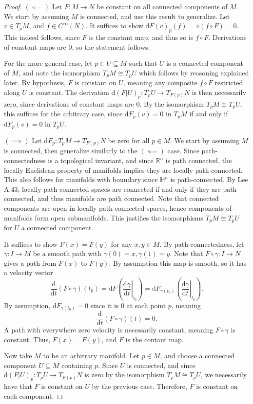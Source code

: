 \documentclass[11pt, letterpaper]{article}
\theoremstyle{plain}
\begin{document}
\begin{proof}
	$(\impliedby )$ Let $F : M \to N$ be constant on all connected components of $M$. We start by assuming $M$ is connected, and use this result to generalize. Let $v\in T_pM$, and $f\in C^\infty (N)$. It suffices to show $\mathrm{d} F(v)_p(f)=v(f\circ F)=0$. This indeed follows, since $F$ is the constant map, and thus so is $f\circ F$. Derivations of constant maps are 0, so the statement follows.

	For the more general case, let $p\in U\subseteq M$ such that $U$ is a connected component of $M$, and note the isomorphism $T_pM \cong T_pU$ which follows by reasoning explained later. By hypothesis, $F$ is constant on $U$, meaning any composite $f\circ F$ restricted along $U$ is constant. The derivation $\mathrm{d} (F|U)_p : T_pU \to T_{F(p)} N$ is then necessarily zero, since derivations of constant maps are 0. By the isomorphism $T_pM\cong T_pU$, this suffices for the arbitrary case, since $\mathrm{d} F_p(v)=0$ in $T_pM$ if and only if $\mathrm{d} F_p(v)=0$ in $T_pU$.

	$(\implies )$ Let $\mathrm{d} F_p : T_pM \to T_{F(p)} N$ be zero for all $p\in M$. We start by assuming $M$ is connected, then generalize similarly to the $(\impliedby )$ case. Since path-connectedness is a topological invariant, and since $\mathbb{R} ^n$ is path connected, the locally Euclidean property of manifolds implies they are locally path-connected. This also follows for manifolds with boundary since $\mathbb{H} ^n$ is path-connected. By Lee A.43, locally path connected spaces are connected if and only if they are path connected, and thus manifolds are path connected. Note that connected components are open in locally path-connected spaces, hence components of manifolds form open submanifolds. This justifies the isomorphisms $T_pM \cong T_pU$ for $U$ a connected component.

	It suffices to show $F(x)=F(y)$ for any $x,y\in M$. By path-connectedness, let $\gamma : I \to M$ be a smooth path with $\gamma (0)=x,\gamma (1)=y$. Note that $F\circ \gamma : I \to N$ gives a path from $F(x)$ to $F(y)$. By assumption this map is smooth, so it has a velocity vector
	\[
		\frac{\mathrm{d}}{\mathrm{d}t} (F\circ \gamma )(t_0)=\mathrm{d}F\left( \left.\frac{\mathrm{d}\gamma }{\mathrm{d}t}\right|_{t_0}\right)=\mathrm{d} F_{\gamma (t_0)} \left(\left.\frac{\mathrm{d}\gamma }{\mathrm{d}t}\right|_{t_0} \right)
	.\]
	By assumption, $\mathrm{d} F_{\gamma (t_0)} =0$ since it is 0 at each point $p$, meaning
	\[
		\frac{\mathrm{d}}{\mathrm{d}t} (F\circ \gamma )(t)=0
	.\]
	A path with everywhere zero velocity is necessarily constant, meaning $F\circ \gamma $ is constant. Thus, $F(x)=F(y)$, and $F$ is the contant map.

	Now take $M$ to be an arbitrary manifold. Let $p\in M$, and choose a connected component $U\subseteq M$ containing $p$. Since $U$ is connected, and since $\mathrm{d} (F|U)_p : T_pU \to T_{F(p)} N$ is zero by the isomorphism $T_pM \cong T_pU$, we necessarily have that $F$ is constant on $U$ by the previous case. Therefore, $F$ is constant on each component.
\end{proof}
\end{document}

